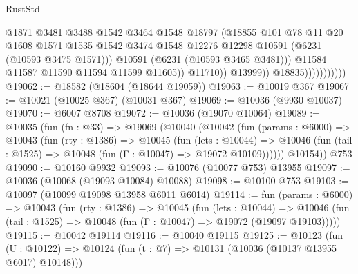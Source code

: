 \begin{lexlean}{RustStd}
\begin{coremodule}
{{                                        @1871
                                        @3481
                                        @3488
                                        @1542
                                        @3464
                                        @1548
                                        @18797
                                        (@18855
                                          @101
                                          @78
                                          @11
                                          @20
                                          @1608
                                          @1571
                                          @1535
                                          @1542
                                          @3474
                                          @1548
                                          @12276
                                          @12298
                                          @10591
                                          (@6231 (@10593 @3475 @1571)))
                                        @10591
                                        (@6231 (@10593 @3465 @3481)))
                                      @11584
                                      @11587
                                      @11590
                                      @11594
                                      @11599
                                      @11605))
                                  @11710))
                              @13999))
                          @18835)))))))))))
@19062 := @18582 (@18604 (@18644 @19059))
@19063 := @10019 @367
@19067 := @10021 (@10025 @367) (@10031 @367)
@19069 := @10036 (@9930 @10037)
@19070 := @6007 @8708
@19072 := @10036 (@19070 @10064)
@19089 := @10035
    (fun (fn : @33) =>
    @19069
      (@10040
        (@10042
          (fun (params : @6000) =>
          @10043
            (fun (rty : @1386) =>
            @10045
              (fun (lets : @10044) =>
              @10046 (fun (tail : @1525) => @10048 (fun (Γ : @10047) => @19072 @10109))))))
        @10154))
    @753
@19090 := @10160 @9932
@19093 := @10076 (@10077 @753) @13955
@19097 := @10036 (@10068 (@19093 @10084) @10088)
@19098 := @10100 @753
@19103 := @10097 (@10099 @19098 @13958 @6011 @6014)
@19114 := fun (params : @6000) =>
  @10043
    (fun (rty : @1386) =>
    @10045
      (fun (lets : @10044) =>
      @10046 (fun (tail : @1525) => @10048 (fun (Γ : @10047) => @19072 (@19097 @19103)))))
@19115 := @10042 @19114
@19116 := @10040 @19115
@19125 := @10123
    (fun (U : @10122) => @10124 (fun (t : @7) => @10131 (@10036 (@10137 @13955 @6017) @10148)))
}}
\end{coremodule}
\end{lexlean}
